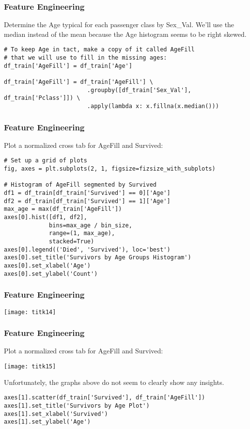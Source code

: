 \begin{frame}[fragile]\frametitle{Feature Engineering}
Determine the Age typical for each passenger class by Sex\_Val. We'll use the median instead of the mean because the Age histogram seems to be right skewed.
\begin{lstlisting}
# To keep Age in tact, make a copy of it called AgeFill 
# that we will use to fill in the missing ages:
df_train['AgeFill'] = df_train['Age']

df_train['AgeFill'] = df_train['AgeFill'] \
                        .groupby([df_train['Sex_Val'], df_train['Pclass']]) \
                        .apply(lambda x: x.fillna(x.median()))
\end{lstlisting}
\end{frame}

\begin{frame}[fragile]\frametitle{Feature Engineering}
Plot a normalized cross tab for AgeFill and Survived:
\begin{lstlisting}
# Set up a grid of plots
fig, axes = plt.subplots(2, 1, figsize=fizsize_with_subplots)

# Histogram of AgeFill segmented by Survived
df1 = df_train[df_train['Survived'] == 0]['Age']
df2 = df_train[df_train['Survived'] == 1]['Age']
max_age = max(df_train['AgeFill'])
axes[0].hist([df1, df2], 
             bins=max_age / bin_size, 
             range=(1, max_age), 
             stacked=True)
axes[0].legend(('Died', 'Survived'), loc='best')
axes[0].set_title('Survivors by Age Groups Histogram')
axes[0].set_xlabel('Age')
axes[0].set_ylabel('Count')
\end{lstlisting}
\end{frame}

\begin{frame}[fragile]\frametitle{Feature Engineering}
\begin{center}
\texttt{[image: titk14]}
\end{center}
\end{frame}

\begin{frame}[fragile]\frametitle{Feature Engineering}
Plot a normalized cross tab for AgeFill and Survived:
\begin{center}
\texttt{[image: titk15]}
\end{center}

Unfortunately, the graphs above do not seem to clearly show any insights.


\begin{lstlisting}
axes[1].scatter(df_train['Survived'], df_train['AgeFill'])
axes[1].set_title('Survivors by Age Plot')
axes[1].set_xlabel('Survived')
axes[1].set_ylabel('Age')
\end{lstlisting}

\end{frame}


